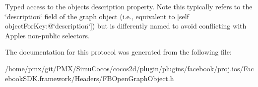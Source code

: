 Typed access to the object\textquotesingle{}s description property.  Note this typically refers to the \char`\"{}description\char`\"{} field of the graph object (i.\+e., equivalent to {\ttfamily \mbox{[}self object\+For\+Key\+:@\char`\"{}description\char`\"{}\mbox{]}}) but is differently named to avoid conflicting with Apple\textquotesingle{}s non-\/public selectors. 

The documentation for this protocol was generated from the following file\+:\begin{DoxyCompactItemize}
\item 
/home/pmx/git/\+P\+M\+X/\+Simu\+Cocos/cocos2d/plugin/plugins/facebook/proj.\+ios/\+Facebook\+S\+D\+K.\+framework/\+Headers/F\+B\+Open\+Graph\+Object.\+h\end{DoxyCompactItemize}
